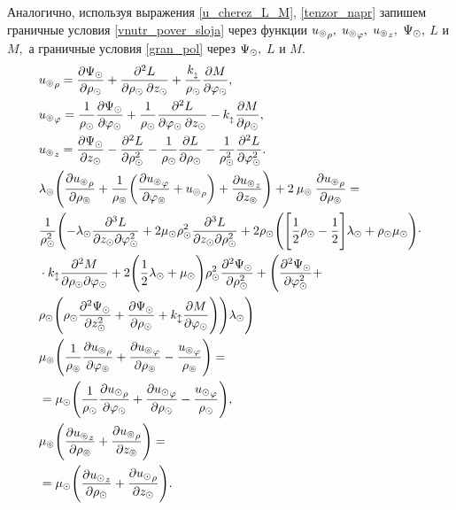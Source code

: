 Аналогично, используя выражения \eqref{u_cherez_L_M}, \eqref{tenzor_napr} запишем граничные условия \eqref{vnutr_pover_sloja} через функции ${u_\circledcirc}_\rho,$ ${u_\circledcirc}_\varphi,$ ${u_\circledcirc}_z,$ $ \Psi_\odot,$ $L$ и $M ,$ а граничные условия \eqref{gran_pol} через $\Psi_\odot,$ $L$ и $M.$
\begin{align}
&{u_\circledcirc}_\rho=\frac{\partial \Psi_\odot}{\partial\rho_\odot}+\frac{\partial^2 L}{\partial\rho_\odot\:\partial z_\odot}+\frac{k_{_\updownarrow}}{\rho_\odot}\frac{\partial M}{\partial \varphi_\odot},\\
&{u_\circledcirc}_\varphi=\frac{1}{\rho_\odot}\frac{\partial \Psi_\odot}{\partial \varphi_\odot}+\frac{1}{\rho_\odot}\frac{\partial^{2} L}{\partial\varphi_\odot\: \partial z_\odot}-k_{_\updownarrow}\frac{\partial M}{\partial \rho_\odot},\\
&{u_\circledcirc}_z=\frac{\partial\Psi_\odot}{\partial z_\odot}-\frac{\partial^{2} L}{\partial \rho^2_\odot}-\frac{1}{\rho_\odot}\frac{\partial L}{\partial \rho_\odot}-\frac{1}{\rho^2_\odot}\frac{\partial^2L}{\partial\varphi^2_\odot}.\\
&\lambda_\circledcirc\Biggl(\frac{\partial {u_\circledcirc}_{\rho}}{\partial \rho_\circledcirc}+\frac{1}{\rho_\circledcirc}\biggl(\frac{\partial {u_\circledcirc}_\varphi}{\partial\varphi_\circledcirc}+{u_\circledcirc}_{\rho}\biggr)+\frac{\partial {u_\circledcirc}_z}{\partial z_\circledcirc}\Biggr)+2\:\mu_\circledcirc\:\frac{\partial {u_\circledcirc}_{\rho}}{\partial \rho_\circledcirc}=\\
&\frac1{\rho^2_\odot}\Biggl(-\lambda_\odot\frac{\partial^3L}{\partial z_\odot\partial\varphi^2_\odot}+2\mu_\odot \rho^2_\odot\frac{\partial^3L}{\partial z_\odot\partial\rho^2_\odot}+2\rho_\odot\Biggl(\Biggl[\frac12\rho_\odot-\frac12\Biggr]\lambda_\odot+\rho_\odot\mu_\odot\Biggr)\cdot\\
&\cdot k_\updownarrow\frac{\partial^2M}{\partial \rho_\odot\partial\varphi_\odot}+2\Biggl(\frac12\lambda_\odot+\mu_\odot\Biggr)\rho^2_\odot\frac{\partial^2\Psi_\odot}{\partial \rho^2_\odot}+\Biggl(\frac{\partial^2\Psi_\odot}{\partial\varphi^2_\odot}+\\
&\rho_\odot\Biggl(\rho_\odot\frac{\partial^2\Psi_\odot}{\partial z^2_\odot}+\frac{\partial \Psi_\odot}{\partial \rho_\odot}+k_\updownarrow\frac{\partial M}{\partial\varphi_\odot}\Biggr)\Biggr)\lambda_\odot\Biggr)\\
&\mu_\circledcirc\Biggl(\frac{1}{\rho_\circledcirc}\frac{\partial {u_\circledcirc}_{\rho}}{\partial\varphi_\circledcirc}+\frac{\partial {u_\circledcirc}_{\varphi}}{\partial \rho_\circledcirc}-\frac{{u_\circledcirc}_{\varphi}}{\rho_\circledcirc}\Biggr)=\\
&=\mu_\odot\Biggl(\frac{1}{\rho_\odot}\frac{\partial {u_\odot}_{\rho}}{\partial\varphi_\odot}+\frac{\partial {u_\odot}_{\varphi}}{\partial \rho_\odot}-\frac{{u_\odot}_{\varphi}}{\rho_\odot}\Biggr),\\
&\mu_\circledcirc\Biggl(\frac{\partial {u_\circledcirc}_z}{\partial \rho_\circledcirc}+\frac{\partial {u_\circledcirc}_{\rho}}{\partial z_\circledcirc}\Biggr)=\\
&=\mu_\odot\Biggl(\frac{\partial {u_\odot}_{z}}{\partial \rho_\odot}+\frac{\partial {u_\odot}_{\rho}}{\partial z_\odot}\Biggr).
\end{align}


